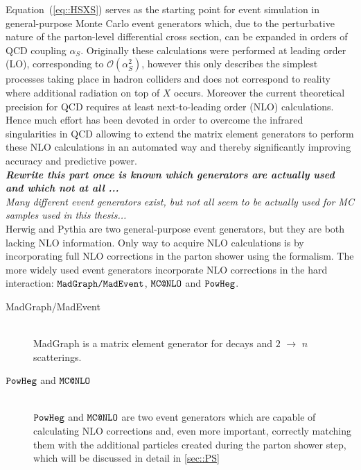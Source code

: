 Equation~(\ref{eq::HSXS}) serves as the starting point for event simulation in general-purpose Monte Carlo event generators which, due to the perturbative nature of the parton-level differential cross section, can be expanded in orders of QCD coupling $\alpha_{S}$. Originally these calculations were performed at leading order (LO), corresponding to $\mathcal{O}(\alpha_{S}^{2})$, however this only describes the simplest processes taking place in hadron colliders and does not correspond to reality where additional radiation on top of $X$ occurs. Moreover the current theoretical precision for QCD requires at least next-to-leading order (NLO) calculations. Hence much effort has been devoted in order to overcome the infrared singularities in QCD allowing to extend the matrix element generators to perform these NLO calculations in an automated way and thereby significantly improving accuracy and predictive power.\\

\textit{\textbf{Rewrite this part once is known which generators are actually used and which not at all ...\\} Many different event generators exist, but not all seem to be actually used for MC samples used in this thesis...}\\
Herwig and Pythia are two general-purpose event generators, but they are both lacking NLO information. Only way to acquire NLO calculations is by incorporating full NLO corrections in the parton shower using the \Powheg formalism. 
The more widely used event generators incorporate NLO corrections in the hard interaction: $\texttt{MadGraph/MadEvent}$, $\texttt{MC@NLO}$ and $\texttt{PowHeg}$.

\begin{myindentpar}
  \begin{description}
    \item[MadGraph/MadEvent] \hfill \\
      MadGraph is a matrix element generator for decays and $2$ $\rightarrow$ $n$ scatterings. %
    \item[$\texttt{PowHeg}$ and $\texttt{MC@NLO}$] \hfill \\
      $\texttt{PowHeg}$ and $\texttt{MC@NLO}$ are two event generators which are capable of calculating NLO corrections and, even more important, correctly matching them with the additional particles created during the parton shower step, which will be discussed in detail in \ref{sec::PS}
  \end{description}
\end{myindentpar}

